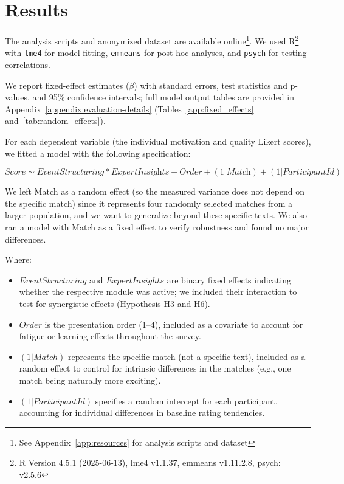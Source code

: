 \section{Results}
\label{sec:summary-results}
The analysis scripts and anonymized dataset are available online\footnote{See Appendix~\ref{app:resources} for analysis scripts and dataset}. We used R\footnote{R Version 4.5.1 (2025-06-13), lme4 v1.1.37, emmeans v1.11.2.8, psych: v2.5.6} with \texttt{lme4} for model fitting, \texttt{emmeans} for post-hoc analyses, and \texttt{psych} for testing correlations.

We report fixed-effect estimates ($\beta$) with standard errors, test statistics and p-values, and 95\% confidence intervals; full model output tables are provided in Appendix~\ref{appendix:evaluation-details} (Tables~\ref{app:fixed_effects} and~\ref{tab:random_effects}).

For each dependent variable (the individual motivation and quality Likert scores), we fitted a model with the following specification:

\begin{equation}
  \textit{Score} \sim \textit{EventStructuring} * \textit{ExpertInsights} + \textit{Order} + (1|\textit{Match}) + (1|\textit{ParticipantId})
\end{equation}

We left Match as a random effect (so the measured variance does not depend on the specific match) since it represents four randomly selected matches from a larger population, and we want to generalize beyond these specific texts. We also ran a model with Match as a fixed effect to verify robustness and found no major differences.

Where:
\begin{itemize}[noitemsep,topsep=0pt]
  \item $EventStructuring$ and $ExpertInsights$ are binary fixed effects indicating whether the respective module was active; we included their interaction to test for synergistic effects (Hypothesis H3 and H6).
  \item $Order$ is the presentation order (1--4), included as a covariate to account for fatigue or learning effects throughout the survey.
  \item $(1|Match)$ represents the specific match (not a specific text), included as a random effect to control for intrinsic differences in the matches (e.g., one match being naturally more exciting).
  \item $(1|ParticipantId)$ specifies a random intercept for each participant, accounting for individual differences in baseline rating tendencies.
\end{itemize}

